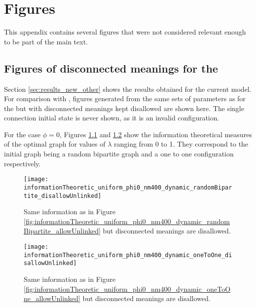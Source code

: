 \chapter{Figures}
\label{cha:app_figures}

This appendix contains several figures that were not considered relevant enough to be part of the main text.

\section{Figures of disconnected meanings for the \secondmodel{}}
\label{sec:app_figures_second-model}

Section \ref{sec:results_new_other} shows the results obtained for the current model.
For comparison with \cite{Ferrer2003a}, figures generated from the same sets of parameters as for the \secondmodel{}  but with disconnected meanings kept disallowed are shown here.
The single connection initial state is never shown, as it is an invalid configuration.

For the case $\phi=0$, Figures \ref{fig:informationTheoretic_uniform_phi0_nm400_dynamic_randomBipartite_disallowUnlinked} and \ref{fig:informationTheoretic_uniform_phi0_nm400_dynamic_oneToOne_disallowUnlinked} show the information theoretical measures of the optimal graph for values of $\lambda$ ranging from 0 to 1. They correspond to the initial graph being a random bipartite graph and a one to one configuration respectively.

\begin{figure}
  \centering
  \texttt{[image: informationTheoretic\_uniform\_phi0\_nm400\_dynamic\_randomBipartite\_disallowUnlinked]}
  \caption{Same information as in Figure \ref{fig:informationTheoretic_uniform_phi0_nm400_dynamic_randomBipartite_allowUnlinked} but disconnected meanings are disallowed.}
  \label{fig:informationTheoretic_uniform_phi0_nm400_dynamic_randomBipartite_disallowUnlinked}
\end{figure}

\begin{figure}
  \centering
  \texttt{[image: informationTheoretic\_uniform\_phi0\_nm400\_dynamic\_oneToOne\_disallowUnlinked]}
  \caption{Same information as in Figure \ref{fig:informationTheoretic_uniform_phi0_nm400_dynamic_oneToOne_allowUnlinked} but disconnected meanings are disallowed.}
  \label{fig:informationTheoretic_uniform_phi0_nm400_dynamic_oneToOne_disallowUnlinked}
\end{figure}

